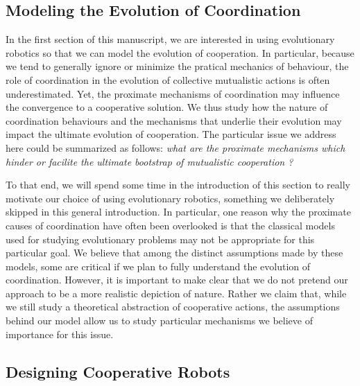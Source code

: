   \subsection{Modeling the Evolution of Coordination}

    In the first section of this manuscript, we are interested in using evolutionary robotics so that we can model the evolution of cooperation. In particular, because we tend to generally ignore or minimize the pratical mechanics of behaviour, the role of coordination in the evolution of collective mutualistic actions is often underestimated. Yet, the proximate mechanisms of coordination may influence the convergence to a cooperative solution. We thus study how the nature of coordination behaviours and the mechanisms that underlie their evolution may impact the ultimate evolution of cooperation. The particular issue we address here could be summarized as follows: \emph{what are the proximate mechanisms which hinder or facilite the ultimate bootstrap of mutualistic cooperation ?}


    To that end, we will spend some time in the introduction of this section to really motivate our choice of using evolutionary robotics, something we deliberately skipped in this general introduction. In particular, one reason why the proximate causes of coordination have often been overlooked is that the classical models used for studying evolutionary problems may not be appropriate for this particular goal. We believe that among the distinct assumptions made by these models, some are critical if we plan to fully understand the evolution of coordination. However, it is important to make clear that we do not pretend our approach to be a more realistic depiction of nature. Rather we claim that, while we still study a theoretical abstraction of cooperative actions, the assumptions behind our model allow us to study particular mechanisms we believe of importance for this issue.


  \subsection{Designing Cooperative Robots}

